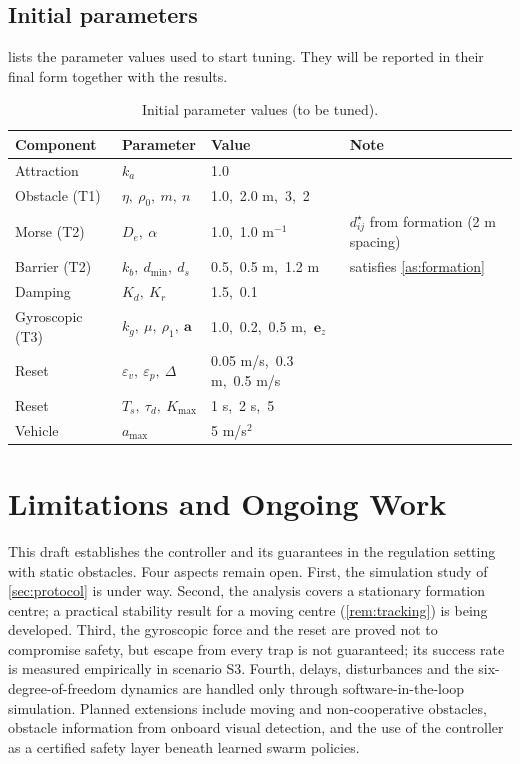 \documentclass[11pt]{article}
\theoremstyle{definition}
\theoremstyle{remark}
\newcommand{\ba}{\mathbf{a}}
\newcommand{\dmin}{d_{\min}}
\newcommand{\amax}{a_{\max}}
\begin{document}
\subsection{Initial parameters}
 lists the parameter values used to start tuning. They will
be reported in their final form together with the results.

\begin{table}[htbp]
\centering
\caption{Initial parameter values (to be tuned).}\label{tab:params}
\small
\begin{tabular}{@{}llll@{}}
\toprule
Component & Parameter & Value & Note \\
\midrule
Attraction & $k_a$ & 1.0 & \\
Obstacle (T1) & $\eta,\ \rho_0,\ m,\ n$ & 1.0,\ 2.0 m,\ 3,\ 2 & \\
Morse (T2) & $D_e,\ \alpha$ & 1.0,\ 1.0 m$^{-1}$ & $d_{ij}^\star$ from formation (2 m spacing) \\
Barrier (T2) & $k_b,\ \dmin,\ d_s$ & 0.5,\ 0.5 m,\ 1.2 m & satisfies \cref{as:formation} \\
Damping & $K_d,\ K_r$ & 1.5,\ 0.1 & \\
Gyroscopic (T3) & $k_g,\ \mu,\ \rho_1,\ \ba$ & 1.0,\ 0.2,\ 0.5 m,\ $\mathbf{e}_z$ & \\
Reset & $\varepsilon_v,\ \varepsilon_p,\ \Delta$ & 0.05 m/s,\ 0.3 m,\ 0.5 m/s & \\
Reset & $T_s,\ \tau_d,\ K_{\max}$ & 1 s,\ 2 s,\ 5 & \\
Vehicle & $\amax$ & 5 m/s$^2$ & \\
\bottomrule
\end{tabular}
\end{table}

\section{Limitations and Ongoing Work}\label{sec:limitations}

This draft establishes the controller and its guarantees in the regulation
setting with static obstacles. Four aspects remain open. First, the simulation
study of \cref{sec:protocol} is under way. Second, the analysis covers a
stationary formation centre; a practical stability result for a moving centre
(\cref{rem:tracking}) is being developed. Third, the gyroscopic force and the
reset are proved not to compromise safety, but escape from every trap is not
guaranteed; its success rate is measured empirically in scenario S3. Fourth,
delays, disturbances and the six-degree-of-freedom dynamics are handled only
through software-in-the-loop simulation. Planned extensions include moving and
non-cooperative obstacles, obstacle information from onboard visual detection,
and the use of the controller as a certified safety layer beneath learned
swarm policies.



\end{document}
